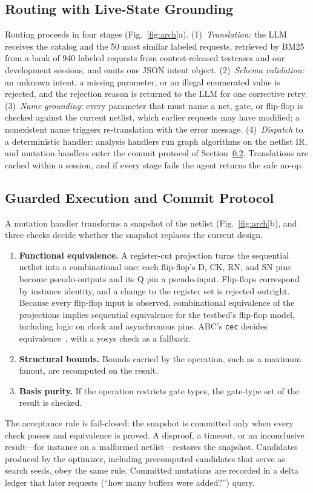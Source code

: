 \documentclass[conference,letterpaper]{IEEEtran}
\begin{document}
\subsection{Routing with Live-State Grounding}
\label{sec:routing}

Routing proceeds in four stages (Fig.~\ref{fig:arch}a).
(1)~\emph{Translation:} the LLM receives the catalog and the 50 most similar
labeled requests, retrieved by BM25 from a bank of 940 labeled requests from
contest-released testcases and our development sessions, and emits one JSON
intent object.
(2)~\emph{Schema validation:} an unknown intent, a missing parameter, or an
illegal enumerated value is rejected, and the rejection reason is returned to
the LLM for one corrective retry. (3)~\emph{Name grounding:} every parameter
that must name a net, gate, or flip-flop is checked against the current
netlist, which earlier requests may have modified; a nonexistent name triggers
re-translation with the error message. (4)~\emph{Dispatch} to a deterministic
handler: analysis handlers run graph algorithms on the netlist IR, and
mutation handlers enter the commit protocol of Section~\ref{sec:commit}.
Translations are cached within a session, and if every stage fails the agent
returns the safe no-op.

\subsection{Guarded Execution and Commit Protocol}
\label{sec:commit}

A mutation handler transforms a snapshot of the netlist
(Fig.~\ref{fig:arch}b), and three checks decide whether the snapshot replaces
the current design.
\begin{enumerate}
\item \textbf{Functional equivalence.} A register-cut projection turns the
  sequential netlist into a combinational one: each flip-flop's D, CK, RN, and
  SN pins become pseudo-outputs and its Q pin a pseudo-input. Flip-flops
  correspond by instance identity, and a change to the register set is
  rejected outright. Because every flip-flop input is observed, combinational
  equivalence of the projections implies sequential equivalence for the
  testbed's flip-flop model, including logic on clock and asynchronous pins.
  ABC's \texttt{cec} decides equivalence~\cite{abc}, with a yosys check as a
  fallback.
\item \textbf{Structural bounds.} Bounds carried by the operation, such as a
  maximum fanout, are recomputed on the result.
\item \textbf{Basis purity.} If the operation restricts gate types, the
  gate-type set of the result is checked.
\end{enumerate}
The acceptance rule is fail-closed: the snapshot is committed only when every
check passes and equivalence is proved. A disproof, a timeout, or an
inconclusive result---for instance on a malformed netlist---restores the
snapshot. Candidates produced by the optimizer, including precomputed
candidates that serve as search seeds, obey the same rule. Committed mutations
are recorded in a delta ledger that later requests (``how many buffers were
added?'') query.
\end{document}
